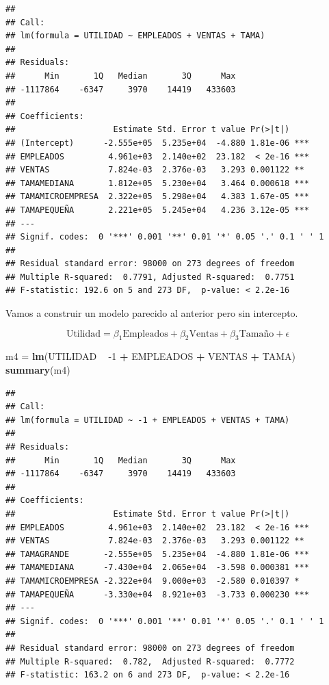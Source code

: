 \documentclass[letterpaper,]{book}
\newenvironment{Shaded}{\begin{snugshade}}{\end{snugshade}}
\newcommand{\DecValTok}[1]{\textcolor[rgb]{0.00,0.00,0.81}{#1}}
\newcommand{\KeywordTok}[1]{\textcolor[rgb]{0.13,0.29,0.53}{\textbf{#1}}}
\newcommand{\NormalTok}[1]{#1}
\newcommand{\OperatorTok}[1]{\textcolor[rgb]{0.81,0.36,0.00}{\textbf{#1}}}
\newcommand{\StringTok}[1]{\textcolor[rgb]{0.31,0.60,0.02}{#1}}
\begin{document}
\begin{verbatim}
## 
## Call:
## lm(formula = UTILIDAD ~ EMPLEADOS + VENTAS + TAMA)
## 
## Residuals:
##      Min       1Q   Median       3Q      Max 
## -1117864    -6347     3970    14419   433603 
## 
## Coefficients:
##                    Estimate Std. Error t value Pr(>|t|)    
## (Intercept)      -2.555e+05  5.235e+04  -4.880 1.81e-06 ***
## EMPLEADOS         4.961e+03  2.140e+02  23.182  < 2e-16 ***
## VENTAS            7.824e-03  2.376e-03   3.293 0.001122 ** 
## TAMAMEDIANA       1.812e+05  5.230e+04   3.464 0.000618 ***
## TAMAMICROEMPRESA  2.322e+05  5.298e+04   4.383 1.67e-05 ***
## TAMAPEQUEÑA       2.221e+05  5.245e+04   4.236 3.12e-05 ***
## ---
## Signif. codes:  0 '***' 0.001 '**' 0.01 '*' 0.05 '.' 0.1 ' ' 1
## 
## Residual standard error: 98000 on 273 degrees of freedom
## Multiple R-squared:  0.7791, Adjusted R-squared:  0.7751 
## F-statistic: 192.6 on 5 and 273 DF,  p-value: < 2.2e-16
\end{verbatim}

Vamos a construir un modelo parecido al anterior pero sin intercepto.

\begin{equation}
  \text{Utilidad} =  \beta_1 \text{Empleados} + \beta_2 \text{Ventas} + \beta_3 \text{Tamaño} + \epsilon
    \label{eq:modelo5}
\end{equation}

\begin{Shaded}
\begin{Highlighting}[]
\NormalTok{m4 =}\StringTok{ }\KeywordTok{lm}\NormalTok{(UTILIDAD }\OperatorTok{~}\StringTok{ }\DecValTok{-1} \OperatorTok{+}\StringTok{ }\NormalTok{EMPLEADOS }\OperatorTok{+}\StringTok{ }\NormalTok{VENTAS }\OperatorTok{+}\StringTok{ }\NormalTok{TAMA)}
\KeywordTok{summary}\NormalTok{(m4)}
\end{Highlighting}
\end{Shaded}

\begin{verbatim}
## 
## Call:
## lm(formula = UTILIDAD ~ -1 + EMPLEADOS + VENTAS + TAMA)
## 
## Residuals:
##      Min       1Q   Median       3Q      Max 
## -1117864    -6347     3970    14419   433603 
## 
## Coefficients:
##                    Estimate Std. Error t value Pr(>|t|)    
## EMPLEADOS         4.961e+03  2.140e+02  23.182  < 2e-16 ***
## VENTAS            7.824e-03  2.376e-03   3.293 0.001122 ** 
## TAMAGRANDE       -2.555e+05  5.235e+04  -4.880 1.81e-06 ***
## TAMAMEDIANA      -7.430e+04  2.065e+04  -3.598 0.000381 ***
## TAMAMICROEMPRESA -2.322e+04  9.000e+03  -2.580 0.010397 *  
## TAMAPEQUEÑA      -3.330e+04  8.921e+03  -3.733 0.000230 ***
## ---
## Signif. codes:  0 '***' 0.001 '**' 0.01 '*' 0.05 '.' 0.1 ' ' 1
## 
## Residual standard error: 98000 on 273 degrees of freedom
## Multiple R-squared:  0.782,  Adjusted R-squared:  0.7772 
## F-statistic: 163.2 on 6 and 273 DF,  p-value: < 2.2e-16
\end{verbatim}
\end{document}
